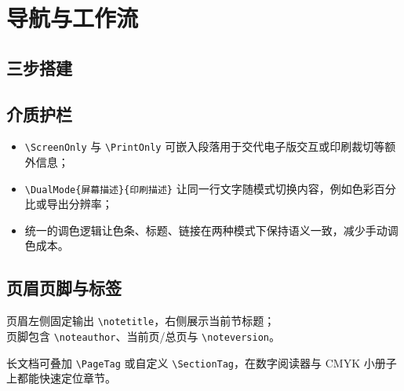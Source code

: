 \documentclass[a4paper,11pt]{ctexart}
\begin{document}
\clearpage
\section{导航与工作流}

\subsection{三步搭建}
\begin{roadmap}
\end{roadmap}

\subsection{介质护栏}
\begin{itemize}
    \item \texttt{\textbackslash ScreenOnly} 与 \texttt{\textbackslash PrintOnly} 可嵌入段落用于交代电子版交互或印刷裁切等额外信息；
    \item \texttt{\textbackslash DualMode\{屏幕描述\}\{印刷描述\}} 让同一行文字随模式切换内容，例如色彩百分比或导出分辨率；
    \item 统一的调色逻辑让色条、标题、链接在两种模式下保持语义一致，减少手动调色成本。
\end{itemize}

\subsection{页眉页脚与标签}
\noindent 页眉左侧固定输出 \texttt{\textbackslash note\allowbreak title}，右侧展示当前节标题；\\
页脚包含 \texttt{\textbackslash note\allowbreak author}、当前页/总页与 \texttt{\textbackslash note\allowbreak version}。
\par\noindent
长文档可叠加 \texttt{\textbackslash Page\allowbreak Tag} 或自定义 \texttt{\textbackslash Section\allowbreak Tag}，在数字阅读器与 CMYK 小册子上都能快速定位章节。
\end{document}

